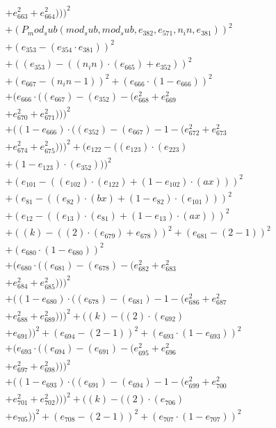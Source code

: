 \documentclass[10pt, a4paper]{article}
\begin{document}
\begin{align*}
& + e_{663}^{2} + e_{664}^{2})))^{2} \\
& + (P_mod_sub(mod_sub, mod_sub, e_{382}, e_{571}, n_in, e_{381}))^{2} \\
& + (e_{353} - (e_{354}  \cdot  e_{381}))^{2} \\
& + ((e_{353}) - ((n_in)  \cdot  (e_{665}) + e_{352}))^{2} \\
& + (e_{667} - (n_in - 1))^{2} + (e_{666}  \cdot  (1 - e_{666}))^{2} \\
& + (e_{666}  \cdot  ((e_{667}) - (e_{352}) - (e_{668}^{2} + e_{669}^{2} \\
& + e_{670}^{2} + e_{671}^{2})))^{2} \\
& + ((1 - e_{666})  \cdot  ((e_{352}) - (e_{667}) - 1 - (e_{672}^{2} + e_{673}^{2} \\
& + e_{674}^{2} + e_{675}^{2})))^{2} + (e_{122} - ((e_{123})  \cdot  (e_{223}) \\
& + (1 - e_{123})  \cdot  (e_{352})))^{2} \\
& + (e_{101} - ((e_{102})  \cdot  (e_{122}) + (1 - e_{102})  \cdot  (ax)))^{2} \\
& + (e_{81} - ((e_{82})  \cdot  (bx) + (1 - e_{82})  \cdot  (e_{101})))^{2} \\
& + (e_{12} - ((e_{13})  \cdot  (e_{81}) + (1 - e_{13})  \cdot  (ax)))^{2} \\
& + ((k) - ((2)  \cdot  (e_{679}) + e_{678}))^{2} + (e_{681} - (2 - 1))^{2} \\
& + (e_{680}  \cdot  (1 - e_{680}))^{2} \\
& + (e_{680}  \cdot  ((e_{681}) - (e_{678}) - (e_{682}^{2} + e_{683}^{2} \\
& + e_{684}^{2} + e_{685}^{2})))^{2} \\
& + ((1 - e_{680})  \cdot  ((e_{678}) - (e_{681}) - 1 - (e_{686}^{2} + e_{687}^{2} \\
& + e_{688}^{2} + e_{689}^{2})))^{2} + ((k) - ((2)  \cdot  (e_{692}) \\
& + e_{691}))^{2} + (e_{694} - (2 - 1))^{2} + (e_{693}  \cdot  (1 - e_{693}))^{2} \\
& + (e_{693}  \cdot  ((e_{694}) - (e_{691}) - (e_{695}^{2} + e_{696}^{2} \\
& + e_{697}^{2} + e_{698}^{2})))^{2} \\
& + ((1 - e_{693})  \cdot  ((e_{691}) - (e_{694}) - 1 - (e_{699}^{2} + e_{700}^{2} \\
& + e_{701}^{2} + e_{702}^{2})))^{2} + ((k) - ((2)  \cdot  (e_{706}) \\
& + e_{705}))^{2} + (e_{708} - (2 - 1))^{2} + (e_{707}  \cdot  (1 - e_{707}))^{2} \\

\end{align*}
\end{document}
